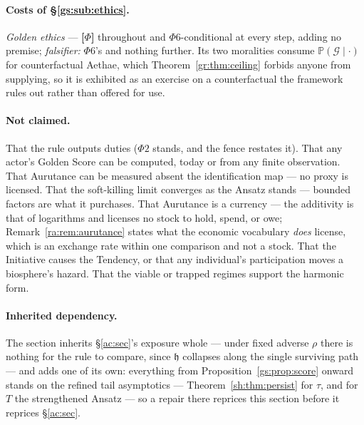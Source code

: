 \documentclass[11pt]{article}
\numberwithin{equation}{section}
\theoremstyle{plain}
\theoremstyle{definition}
\theoremstyle{remark}
\newcommand{\PP}{\mathbb{P}}
\newcommand{\hm}{\mathfrak{h}}
\begin{document}
\paragraph{Costs of \S\ref{gs:sub:ethics}.} \emph{Golden ethics} ---
\textbf{[$\Phi$]} throughout and $\Phi6$-conditional at every step, adding
no premise; \emph{falsifier:} $\Phi6$'s and nothing further. Its two
moralities consume $\PP(\mathcal G\mid\cdot)$ for counterfactual Aethae,
which Theorem~\ref{gr:thm:ceiling} forbids anyone from supplying, so it is
exhibited as an exercise on a counterfactual the framework rules out rather
than offered for use.

\paragraph{Not claimed.} That the rule outputs duties ($\Phi2$ stands, and the fence restates it). That any actor's Golden Score can be computed, today or from any finite observation. That Aurutance can be measured absent the identification map --- no proxy is licensed. That the soft-killing limit converges as the Ansatz stands --- bounded factors are what it purchases. That Aurutance is a currency --- the additivity is that of logarithms and licenses no stock to hold, spend, or owe; Remark~\ref{ra:rem:aurutance} states what the economic vocabulary \emph{does} license, which is an exchange rate within one comparison and not a stock. That the Initiative causes the Tendency, or that any individual's participation moves a biosphere's hazard. That the viable or trapped regimes support the harmonic form.

\paragraph{Inherited dependency.} The section inherits \S\ref{ac:sec}'s exposure whole --- under fixed adverse $\rho$ there is nothing for the rule to compare, since $\hm$ collapses along the single surviving path --- and adds one of its own: everything from Proposition~\ref{gs:prop:score} onward stands on the refined tail asymptotics --- Theorem~\ref{sh:thm:persist} for $\tau$, and for $T$ the strengthened Ansatz --- so a repair there reprices this section before it reprices \S\ref{ac:sec}.
\end{document}
